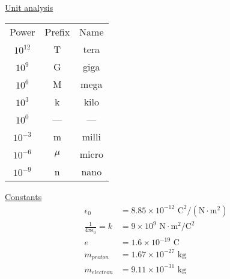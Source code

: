 \thispagestyle{empty}
\newcommand{\degrees}{$^\circ$}
\setlength{\parindent}{12pt}

\begin{center}
	\\
\end{center}
\begin{multicols}{2}
	\begin{minipage}{\columnwidth}
		\centering\underline{Unit analysis}\\
		\begin{tabular}{c c c}
			Power & Prefix & Name\\
			$10^{12}$ & T & tera\\
			$10^9$ & G & giga\\
			$10^6$ & M & mega\\
			$10^3$ & k & kilo\\
			$10^0$ & --- & ---\\
			$10^{-3}$ & m & milli\\
			$10^{-6}$ & $\mu$ & micro\\
			$10^{-9}$ & n & nano
		\end{tabular}
	\end{minipage}
	
	\vspace{12pt}
	\begin{minipage}{\columnwidth}
		\centering\underline{Constants}
		\begin{align*}
			\epsilon_0 &= 8.85\times 10^{-12} \text{ C}^2/ \left(\text{N}\cdot\text{m}^2\right)\\
			\frac{1}{4\pi\epsilon_0} = k&=9\times 10^9 \text{ N}\cdot \text{m}^2/\text{C}^2\\
			e&=1.6\times 10^{-19} \text{ C}\\
			m_{proton}&=1.67\times 10^{-27}\text{ kg}\\
			m_{electron}&=9.11\times 10^{-31}\text{ kg}\\
		\end{align*}
	\end{minipage}
	

\end{multicols}
